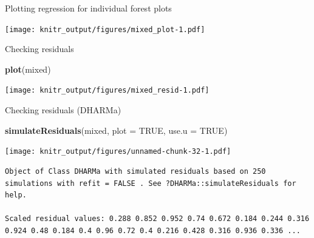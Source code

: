 \documentclass[10pt,ignorenonframetext,]{beamer}
\newenvironment{Shaded}{\begin{snugshade}}{\end{snugshade}}
\newcommand{\KeywordTok}[1]{\textcolor[rgb]{0.13,0.29,0.53}{\textbf{{#1}}}}
\newcommand{\DataTypeTok}[1]{\textcolor[rgb]{0.13,0.29,0.53}{{#1}}}
\newcommand{\DecValTok}[1]{\textcolor[rgb]{0.00,0.00,0.81}{{#1}}}
\newcommand{\StringTok}[1]{\textcolor[rgb]{0.31,0.60,0.02}{{#1}}}
\newcommand{\OtherTok}[1]{\textcolor[rgb]{0.56,0.35,0.01}{{#1}}}
\newcommand{\NormalTok}[1]{{#1}}
\begin{document}
\begin{frame}[fragile]{Plotting regression for individual forest plots}

\begin{Shaded}
\end{Shaded}

\texttt{[image: knitr\_output/figures/mixed\_plot-1.pdf]}

\end{frame}

\begin{frame}[fragile]{Checking residuals}

\begin{Shaded}
\begin{Highlighting}[]
\KeywordTok{plot}\NormalTok{(mixed)}
\end{Highlighting}
\end{Shaded}

\texttt{[image: knitr\_output/figures/mixed\_resid-1.pdf]}

\end{frame}

\begin{frame}[fragile]{Checking residuals (DHARMa)}

\begin{Shaded}
\begin{Highlighting}[]
\KeywordTok{simulateResiduals}\NormalTok{(mixed, }\DataTypeTok{plot =} \OtherTok{TRUE}\NormalTok{, }\DataTypeTok{use.u =} \OtherTok{TRUE}\NormalTok{)}
\end{Highlighting}
\end{Shaded}

\texttt{[image: knitr\_output/figures/unnamed-chunk-32-1.pdf]}

\begin{verbatim}
Object of Class DHARMa with simulated residuals based on 250 simulations with refit = FALSE . See ?DHARMa::simulateResiduals for help. 
 
Scaled residual values: 0.288 0.852 0.952 0.74 0.672 0.184 0.244 0.316 0.924 0.48 0.184 0.4 0.96 0.72 0.4 0.216 0.428 0.316 0.936 0.336 ...
\end{verbatim}

\end{frame}
\end{document}
